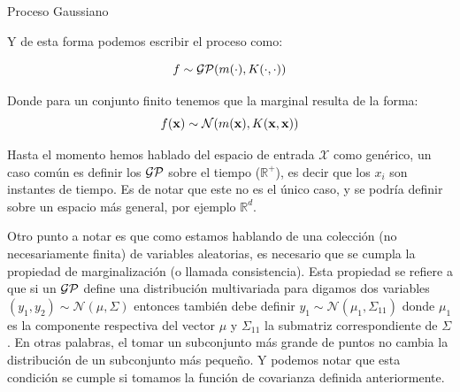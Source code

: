 \documentclass[handout, 9pt]{beamer}
\begin{document}
\begin{frame}{Proceso Gaussiano}

Y de esta forma podemos escribir el proceso como: \pause 

\begin{equation*}
  f \sim \mathcal{GP}(m(\cdot), K(\cdot, \cdot))
\end{equation*}  \pause 

Donde para un conjunto finito tenemos que la marginal resulta de la forma:
\pause
\begin{equation*}
  f(\mathbf{x}) \sim \mathcal{N}(m(\mathbf{x}), K(\mathbf{x}, \mathbf{x}))
\end{equation*} \pause 



Hasta el momento hemos hablado del espacio de entrada $\mathcal{X}$ como genérico, un caso común es definir los $\mathcal{GP}$ sobre el tiempo ($\mathbb{R}^{+}$), es decir que los $x_i$ son instantes de tiempo. Es de notar que este no es el único caso, y se podría definir sobre un espacio más general, por ejemplo $\mathbb{R}^d$. \pause

\vspace{0.2cm}

Otro punto a notar es que como estamos hablando de una colección (no necesariamente finita) de variables aleatorias, es necesario que se cumpla la propiedad de marginalización (o llamada consistencia). Esta propiedad se refiere a que si un $\mathcal{GP}$ define una distribución multivariada para digamos dos variables $(y_1, y_2) \sim \mathcal{N}(\mu, \Sigma)$ entonces también debe definir $y_1 \sim \mathcal{N}(\mu_1, \Sigma_{11})$ donde $\mu_1$ es la componente respectiva del vector $\mu$ y $\Sigma_{11}$ la submatriz correspondiente de $\Sigma$. En otras palabras, el tomar un subconjunto más grande de puntos no cambia la distribución de un subconjunto más pequeño. Y podemos notar que esta condición se cumple si tomamos la función de covarianza definida anteriormente.

\end{frame}
\end{document}
